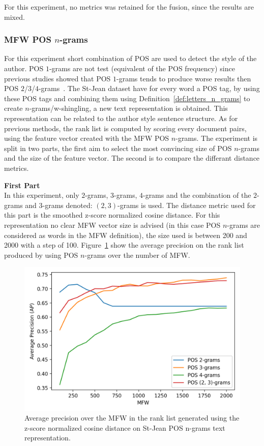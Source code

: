 For this experiment, no metrics was retained for the fusion, since the results are mixed.

\subsubsection{MFW POS $n$-grams}

For this experiment short combination of POS are used to detect the style of the author.
POS $1$-grams are not test (equivalent of the POS frequency) since previous studies showed that POS $1$-grams tends to produce worse results then POS $2$/$3$/$4$-grams~\cite{kocher_linking}.
The St-Jean dataset have for every word a POS tag, by using these POS tags and combining them using Definition~\ref{def:letters_n_grams} to create $n$-grams/w-shingling, a new text representation is obtained.
This representation can be related to the author style sentence structure.
As for previous methods, the rank list is computed by scoring every document pairs, using the feature vector created with the MFW POS $n$-grams.
The experiment is split in two parts, the first aim to select the most convincing size of POS $n$-grams and the size of the feature vector.
The second is to compare the differant distance metrics.

\textbf{First Part}\\
In this experiment, only $2$-grams, $3$-grams, $4$-grams and the combination of the $2$-grams and $3$-grams denoted: $(2, 3)$-grams is used.
The distance metric used for this part is the smoothed z-score normalized cosine distance.
For this representation no clear MFW vector size is advised (in this case POS $n$-grams are considered as words in the MFW definition), the size used is between 200 and 2000 with a step of 100.
Figure~\ref{fig:pos_ngrams} show the average precision on the rank list produced by using POS $n$-grams over the number of MFW.

\begin{figure}
  \centering
  \caption{Average precision over the MFW in the rank list generated using the z-score normalized cosine distance on St-Jean POS n-grams text representation.}
  \label{fig:pos_ngrams}
  \includegraphics[width=\linewidth]{img/pos_ngrams.png}
\end{figure}

